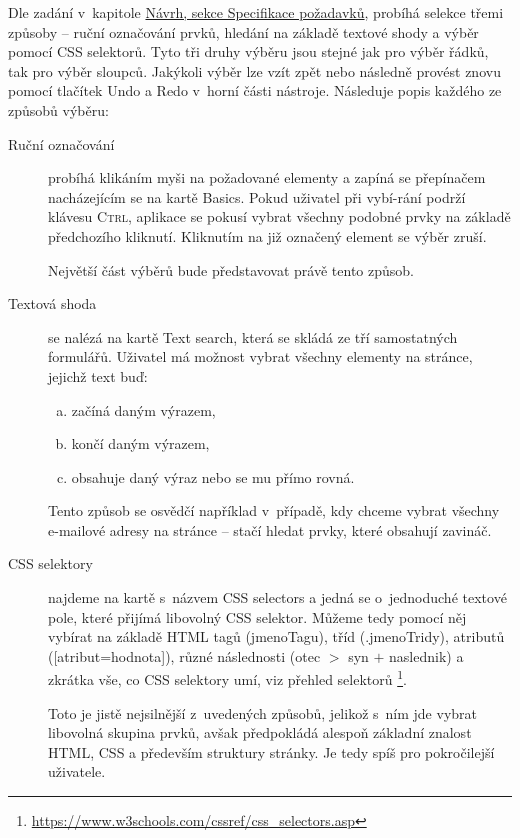 \documentclass[thesis=B,czech]{FITthesis}[2012/06/26]
\begin{document}
Dle zadání v~kapitole \hyperref[sec:requirements_specification]{Návrh, sekce Specifikace požadavků}, probíhá selekce třemi způsoby -- ruční označování prvků, hledání na základě textové shody a výběr pomocí CSS selektorů. Tyto tři druhy výběru jsou stejné jak pro výběr řádků, tak pro výběr sloupců. Jakýkoli výběr lze vzít zpět nebo následně provést znovu pomocí tlačítek \textsf{Undo} a \textsf{Redo} v~horní části nástroje. Následuje popis každého ze způsobů výběru:
\begin{description}
	\item[Ruční označování] probíhá klikáním myši na požadované elementy a zapíná se přepínačem nacházejícím se na kartě \textsf{Basics}. Pokud uživatel při vybí-rání podrží klávesu \textsc{Ctrl}, aplikace se pokusí vybrat všechny podobné prvky na základě předchozího kliknutí. Kliknutím na již označený element se výběr zruší.
	
	Největší část výběrů bude představovat právě tento způsob.
	\clearpage
	\item [Textová shoda] se nalézá na kartě \textsf{Text search}, která se skládá ze tří samostatných formulářů. Uživatel má možnost vybrat všechny elementy na stránce, jejichž text buď:
	\begin{enumerate}[a)]
		\item začíná daným výrazem,
		\item končí daným výrazem,
		\item obsahuje daný výraz nebo se mu přímo rovná.
	\end{enumerate}
	Tento způsob se osvědčí například v~případě, kdy chceme vybrat všechny e-mailové adresy na stránce -- stačí hledat prvky, které obsahují zavináč.
	\item [CSS selektory] najdeme na kartě s~názvem \textsf{CSS selectors} a jedná se o~jednoduché textové pole, které přijímá libovolný CSS selektor. Můžeme tedy pomocí něj vybírat na základě HTML tagů (\textsf{jmenoTagu}), tříd (\textsf{.jmenoTridy}), atributů (\textsf{[atribut=hodnota]}), různé následnosti (\textsf{otec $>$ syn $+$ naslednik}) a zkrátka vše, co CSS selektory umí, viz přehled selektorů \footnote{\url{https://www.w3schools.com/cssref/css_selectors.asp}}.
	
	Toto je jistě nejsilnější z~uvedených způsobů, jelikož s~ním jde vybrat libovolná skupina prvků, avšak předpokládá alespoň základní znalost HTML, CSS a především struktury stránky. Je tedy spíš pro pokročilejší uživatele.
\end{description}
\vfill
\end{document}
